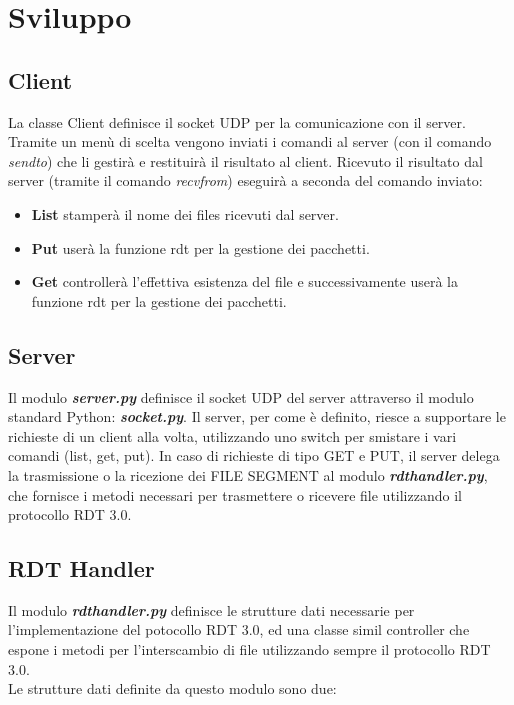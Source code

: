 \documentclass{article}
\begin{document}
\newpage
\section{Sviluppo}
\subsection{Client}


La classe Client definisce il socket UDP per la comunicazione con il server.
Tramite un menù di scelta vengono inviati i comandi al server (con il comando  \textit{sendto}) che li gestirà e restituirà il risultato al client.
Ricevuto il risultato dal server (tramite il comando \textit{recvfrom}) eseguirà a seconda del comando inviato:
\begin{itemize}
    \item \textbf{List} stamperà il nome dei files ricevuti dal server.
    \item \textbf{Put} userà la funzione rdt per la gestione dei pacchetti.
    \item \textbf{Get} controllerà l'effettiva esistenza del file e successivamente userà la funzione rdt per la gestione dei pacchetti.
\end{itemize}

\subsection{Server}


Il modulo \textbf{\emph{server.py}} definisce il socket UDP del server attraverso il modulo standard Python: \textbf{\emph{socket.py}}.
Il server, per come è definito, riesce a supportare le richieste di un client alla volta, utilizzando uno switch per smistare i vari comandi (list, get, put).
In caso di richieste di tipo GET e PUT, il server delega la trasmissione o la ricezione dei FILE SEGMENT al modulo \textbf{\emph{rdt\textunderscore handler.py}},
che fornisce i metodi necessari per trasmettere o ricevere file utilizzando il protocollo RDT 3.0.

\subsection{RDT Handler}

Il modulo \textbf{\emph{rdt\textunderscore handler.py}} definisce le strutture dati necessarie per l'implementazione del potocollo RDT 3.0, ed una classe simil controller che espone i metodi per l'interscambio di file utilizzando sempre il protocollo RDT 3.0.\\
Le strutture dati definite da questo modulo sono due: 
\end{document}
